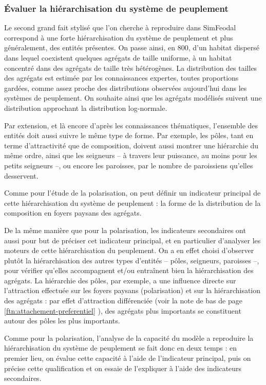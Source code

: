 \documentclass[12pt, a4paper, oneside]{book}
\begin{document}
	\subsubsection{Évaluer la hiérarchisation du système de peuplement}
	
	Le second grand fait stylisé que l'on cherche à reproduire dans SimFeodal correspond à une forte hiérarchisation du système de peuplement et plus généralement, des entités présentes. On passe ainsi, en 800, d'un habitat dispersé dans lequel coexistent quelques agrégats de taille uniforme, à un habitat concentré dans des agrégats de taille très hétérogènes. La distribution des tailles des agrégats est estimée par les connaissances expertes, toutes proportions gardées, comme assez proche des distributions observées aujourd'hui dans les systèmes de peuplement.
	On souhaite ainsi que les agrégats modélisés suivent une distribution approchant la distribution log-normale.
	
	Par extension, et là encore d'après les connaissances thématiques, l'ensemble des entités doit aussi suivre le même type de forme. Par exemple, les pôles, tant en terme d'attractivité que de composition, doivent aussi montrer une hiérarchie du même ordre, ainsi que les seigneurs -- à travers leur puissance, au moins pour les petits seigneurs --, ou encore les paroisses, par le nombre de paroissiens qu'elles desservent.
	
	Comme pour l'étude de la polarisation, on peut définir un indicateur principal de cette hiérarchisation du système de peuplement : la forme de la distribution de la composition en foyers paysans des agrégats.
	
	De la même manière que pour la polarisation, les indicateurs secondaires ont aussi pour but de préciser cet indicateur principal, et en particulier d'analyser les moteurs de cette hiérarchisation du peuplement.
	On a en effet choisi d'observer plutôt la hiérarchisation des autres types d'entités -- pôles, seigneurs, paroisses --, pour vérifier qu'elles accompagnent et/ou entraînent bien la hiérarchisation des agrégats. La hiérarchie des pôles, par exemple, a une influence directe sur l'attraction effectuée sur les foyers paysans (polarisation) et sur la hiérarchisation des agrégats : par effet d'attraction différenciée (voir la note de bas de page \ref{ftn:attachement-preferentiel} ), des agrégats plus importants se constituent autour des pôles les plus importants.
	
	Comme pour la polarisation, l'analyse de la capacité du modèle a reproduire la hiérarchisation du système de peuplement se fait donc en deux temps : en premier lieu, on évalue cette capacité à l'aide de l'indicateur principal, puis on précise cette qualification et on essaie de l'expliquer à l'aide des indicateurs secondaires.
	
\end{document}
